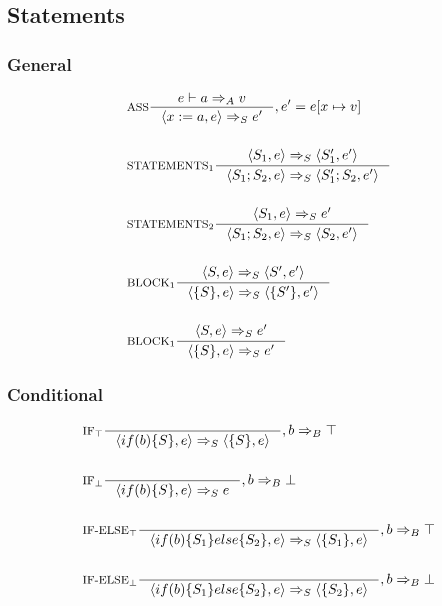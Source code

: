 \subsection{Statements}
\newcommand{\Tlet}{\text{let}}
\subsubsection{General}
\begin{align*}
&\inference[$\text{ASS}$]{e \vdash a \Rightarrow_A v}
                         {\Braket{x := a,e} \Rightarrow_S e'}
												{, e' = e[x \mapsto v]}
\\\\
&\inference[$\text{STATEMENTS}_1$]{\Braket{S_1,e} \Rightarrow_S \Braket{S_1',e'}}
                         {\Braket{S_1;S_2,e} \Rightarrow_S \Braket{S_1';S_2,e'}}
\\\\
&\inference[$\text{STATEMENTS}_2$]{\Braket{S_1,e} \Rightarrow_S e'}
                         {\Braket{S_1;S_2,e} \Rightarrow_S \Braket{S_2,e'}}
\\\\
&\inference[$\text{BLOCK}_1$]{\Braket{S,e} \Rightarrow_S \Braket{S',e'}}
                         {\Braket{\{S\},e} \Rightarrow_S \Braket{\{S'\},e'}}
\\\\
&\inference[$\text{BLOCK}_1$]{\Braket{S,e} \Rightarrow_S e'}
                         {\Braket{\{S\},e} \Rightarrow_S e'}
\end{align*}

\subsubsection{Conditional}
\newcommand{\Tif}{\text{if}}
\newcommand{\Telse}{\text{else}}

\begin{align*}
&\inference[$\text{IF}_\top$]{}
                      {\Braket{if(b)\{S\},e} \Rightarrow_S \Braket{\{S\},e}}
											{,b \Rightarrow_B \top}
\\\\
&\inference[$\text{IF}_\bot$]{}
                      {\Braket{if(b)\{S\},e} \Rightarrow_S e}
											{,b \Rightarrow_B \bot}
\\\\
&\inference[$\text{IF-ELSE}_\top$]{}
                      {\Braket{if(b)\{S_1\}else\{S_2\},e} \Rightarrow_S \Braket{\{S_1\},e}}
											{,b \Rightarrow_B \top}
\\\\
&\inference[$\text{IF-ELSE}_\bot$]{}
                      {\Braket{if(b)\{S_1\}else\{S_2\},e} \Rightarrow_S \Braket{\{S_2\},e}}
											{,b \Rightarrow_B \bot}
\end{align*}
